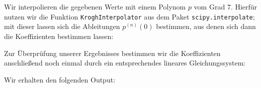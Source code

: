 \section{}

Wir interpolieren die gegebenen Werte mit einem Polynom $p$ vom Grad $7$.
Hierfür nutzen wir die Funktion \texttt{KroghInterpolator} aus dem Paket \texttt{scipy.interpolate};
mit dieser lassen sich die Ableitungen $p^{(n)}(0)$ bestimmen, aus denen sich dann die Koeffizienten bestimmen lassen:



Zur Überprüfung unserer Ergebnisses bestimmen wir die Koeffizienten anschließend noch einmal durch ein entsprechendes lineares Gleichungssystem:



Wir erhalten den folgenden Output:

